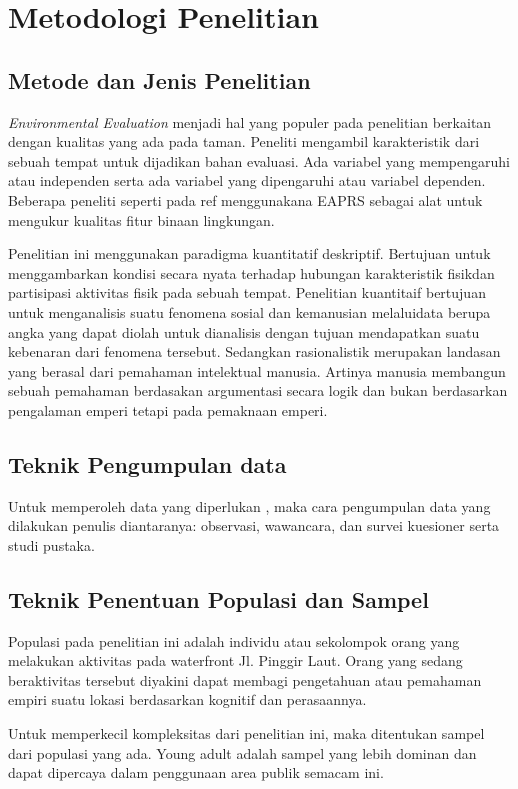 \documentclass[../thesis.tex]{subfiles}
\begin{document}
\chapter{Metodologi Penelitian}\label{chap:method}

\section{Metode dan Jenis Penelitian}

\textit{Environmental Evaluation} menjadi hal yang populer pada penelitian berkaitan dengan kualitas yang ada pada taman.  Peneliti mengambil karakteristik dari sebuah tempat untuk dijadikan bahan evaluasi. Ada variabel yang mempengaruhi atau independen serta ada variabel yang dipengaruhi atau variabel dependen. Beberapa peneliti seperti pada ref menggunakana EAPRS sebagai alat untuk mengukur kualitas fitur binaan lingkungan.

Penelitian ini menggunakan paradigma kuantitatif deskriptif. Bertujuan untuk menggambarkan kondisi secara nyata terhadap hubungan karakteristik fisikdan partisipasi aktivitas fisik pada sebuah tempat.
Penelitian kuantitaif bertujuan untuk menganalisis suatu fenomena sosial dan kemanusian melaluidata berupa angka yang dapat diolah untuk dianalisis dengan tujuan mendapatkan suatu kebenaran dari fenomena tersebut.
Sedangkan rasionalistik merupakan landasan yang berasal dari pemahaman intelektual manusia. Artinya manusia membangun sebuah pemahaman berdasakan argumentasi secara logik dan bukan berdasarkan pengalaman emperi tetapi pada pemaknaan emperi\citep{muhadjir1996metodologi}.

\section{Teknik Pengumpulan data}
Untuk memperoleh data yang diperlukan , maka cara pengumpulan data yang dilakukan penulis diantaranya: observasi, wawancara, dan survei kuesioner serta studi pustaka.

\section{Teknik Penentuan Populasi dan Sampel}

Populasi pada penelitian ini adalah individu atau sekolompok orang yang melakukan aktivitas pada waterfront Jl. Pinggir Laut. Orang yang sedang beraktivitas tersebut diyakini dapat membagi pengetahuan atau pemahaman empiri suatu lokasi berdasarkan kognitif dan perasaannya.

Untuk memperkecil kompleksitas dari penelitian ini, maka ditentukan sampel dari populasi yang ada. Young adult adalah sampel yang lebih dominan dan dapat  dipercaya dalam penggunaan area publik semacam ini.

\end{document}
